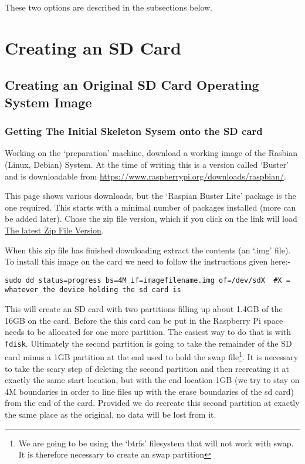 \documentclass[Draft]{akc}
\begin{document}
These two options are described in the subsections below.

\section{Creating an SD Card}
\subsection{Creating an Original SD Card Operating System Image}
\subsubsection{Getting The Initial Skeleton Sysem onto the SD card}
Working on the `preparation' machine, download a working image of the Rasbian (Linux, Debian) System.  At the time of writing
this is a version called `Buster' and is downloadable from
\url{https://www.raspberrypi.org/downloads/raspbian/}.

This page shows various downloads, but the `Raspian Buster Lite' package is the one required. This starts
with a minimal number of packages installed (more can be added later). Chose the zip file version,
which if you click on the link will load
\href{https://downloads.raspberrypi.org/raspbian_lite_latest} {The latest Zip File Version}.

When this zip file has finished downloading extract the contents (an `.img' file).
To install this image on the card we need to follow the instructions given here:-

\begin{lstlisting}
sudo dd status=progress bs=4M if=imagefilename.img of=/dev/sdX  #X = whatever the device holding the sd card is
\end{lstlisting}

This will create an SD card with two partitions filling up about 1.4GB of the 16GB on the card.
Before the this card can be put in the Raspberry Pi space needs to be allocated for one more
partition.  The easiest way to do that is with  \texttt{fdisk}.  Ultimately the second partition is
going to take the remainder of the SD card minus a 1GB partition at the end used to hold the swap
file\footnote{We are going to be using the `btrfs' filesystem that will not work with swap. It is
therefore necessary to create an swap partition}.  It is necessary to
take the scary step of deleting the second partition and then recreating it at exactly the same
start location, but with the end location 1GB (we try to stay on 4M boundaries in order to line files up
with the erase boundaries of the sd card) from the end of the card. Provided we do recreate this
second partition at exactly the same place as the original, no data will be lost from it.
\end{document}
